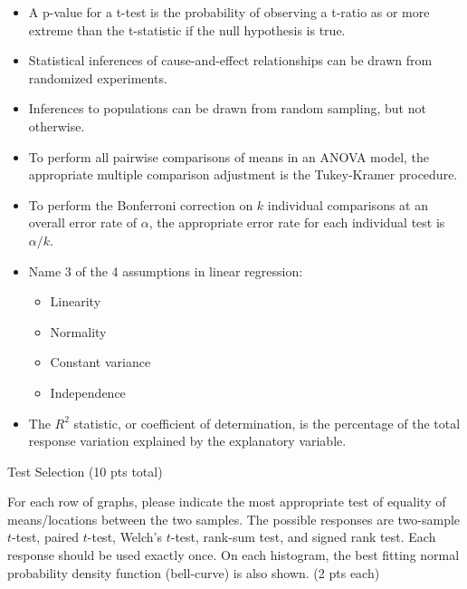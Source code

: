 \documentclass[10pt,draft]{article}
\newenvironment{longitem}{
\begin{itemize}
  \setlength{\itemsep}{15pt}
  \setlength{\parskip}{20pt}
  \setlength{\parsep}{20pt}
}{\end{itemize}}
\newcommand{\correct}[1]{{\color{red} #1}}
\newcommand{\correct}[1]{\underline{\phantom{XXXXXX}}}
\begin{document}
\begin{doublespace}
\begin{large}

\begin{longitem}
\item A p-value for a t-test is the probability of observing a t-ratio \correct{as or more extreme} than the t-statistic if the \correct{null hypothesis} is true.
\item Statistical inferences of cause-and-effect relationships can be drawn from  \correct{randomized experiments}. 
\item Inferences to populations can be drawn from \correct{random sampling}, but not otherwise. 
\item To perform all pairwise comparisons of means in an ANOVA model, the appropriate multiple comparison adjustment is the \correct{Tukey-Kramer} procedure.
\item To perform the Bonferroni correction on $k$ individual comparisons at an overall error rate of $\alpha$, the appropriate error rate for each individual test is \correct{$\alpha/k$}. 
\item Name 3 of the 4 assumptions in linear regression:

\vspace{-0.2in}

	\begin{itemize}
	\item \correct{Linearity}
	\item \correct{Normality}
	\item \correct{Constant variance}
	\item \correct{Independence}
	\end{itemize}
\item The $R^2$ statistic, or coefficient of determination, is the percentage of the \correct{total response variation} explained by the explanatory variable. 
\end{longitem}

\end{large}
\end{doublespace}

\newpage

\noindent \begin{Large}Test Selection  (10 pts total) \end{Large}

\bigskip 

\noindent For each row of graphs, please indicate the most appropriate test of equality of means/locations between the two samples. The possible responses are two-sample $t$-test, paired $t$-test, Welch's $t$-test, rank-sum test, and signed rank test. Each response should be used exactly once. On each histogram, the best fitting normal probability density function (bell-curve) is also shown. (2 pts each)
\end{document}
